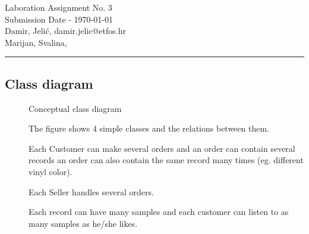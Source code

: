 \documentclass[11pt,a4paper]{article}
\begin{document}
\large
Laboration Assignment No. 3\\
Submission Date - \yyyymmdddate \today \\
Damir, Jelić, damir.jelic@etfos.hr \\
Marijan, Svalina, %
\\
\rule{\linewidth}{0.1mm}

\setcounter{section}{3}
\subsection{Class diagram}
\begin{figure}[htb]
    \begin{center}
        \setlength\fboxsep{0pt}
    \end{center}
    \caption{Conceptual class diagram}
    \label{fig:class_diag}
\end{figure}
\begin{description}
    \item[]
        The figure shows 4 simple classes and the relations between them.
    \item[]
        Each Customer can make several orders and an order can contain several
        records an order can also contain the same record many times (eg. different vinyl color).
    \item[]
        Each Seller handles several orders.
    \item[]
        Each record can have many samples and each customer can 
        listen to as many samples as he/she likes.
\end{description}

\newpage
\end{document}
